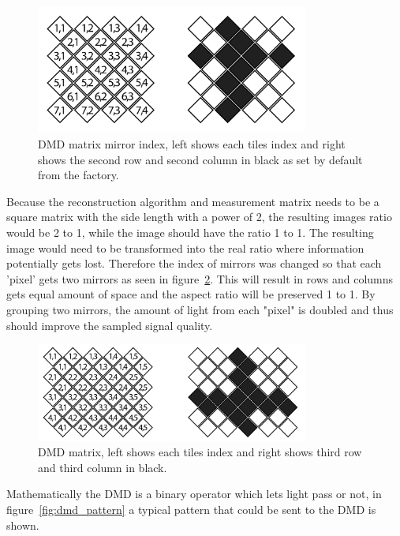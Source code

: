 \begin{figure}[H]
    \centering
    \includegraphics[width = 0.8\textwidth]{gfx/DMD_grid.png}
    \caption{DMD matrix mirror index, left shows each tiles index and right shows the second row and second column in black as set by default from the factory.}
    \label{fig:dmd_index}
\end{figure}

Because the reconstruction algorithm and measurement matrix needs to be a square matrix with the side length with a power of 2, the resulting images ratio would be 2 to 1, while the image should have the ratio 1 to 1. The resulting image would need to be transformed into the real ratio where information potentially gets lost. Therefore the index of mirrors was changed so that each 'pixel' gets two mirrors as seen in figure~\ref{fig:dmd_index2}. This will result in rows and columns gets equal amount of space and the aspect ratio will be preserved 1 to 1. By grouping two mirrors, the amount of light from each "pixel" is doubled and thus should improve the sampled signal quality.

\begin{figure}[H]
    \centering
    \includegraphics[width = 0.8\textwidth]{gfx/DMD_grid2.png}
    \caption{DMD matrix, left shows each tiles index and right shows third row and third column in black.}
    \label{fig:dmd_index2}
\end{figure}

Mathematically the DMD is a binary operator which lets light pass or not, in figure~\ref{fig:dmd_pattern} a typical pattern that could be sent to the DMD is shown.  

